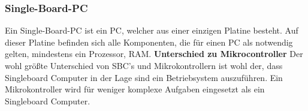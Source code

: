 \subsubsection{Single-Board-PC}
\label{subsec:Single-Board-PC}
Ein Single-Board-PC ist ein PC, welcher aus einer einzigen Platine besteht. Auf dieser Platine befinden sich alle Komponenten, die für einen PC als notwendig gelten, mindestens ein Prozessor, RAM. 
\nextline
\textbf{Unterschied zu Mikrocontroller\nextline}
Der wohl größte Unterschied von SBC’s und Mikrokontrollern ist wohl der, dass Singleboard Computer in der Lage sind ein Betriebsystem auszuführen. Ein Mikrokontroller wird für weniger komplexe Aufgaben eingesetzt als ein Singleboard Computer.